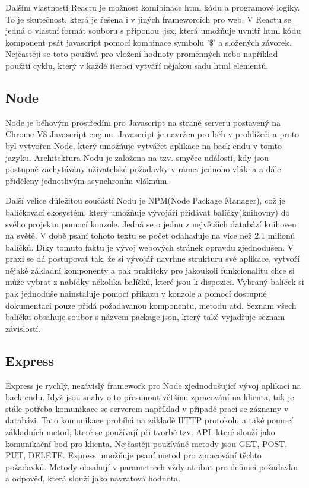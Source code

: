 Dalším vlastností Reactu je možnost komibinace html kódu a programové logiky. To je skutečnost, která je řešena i v jiných frameworcích pro web. V Reactu se jedná o vlastní formát souboru s příponou .jsx, která umožňuje uvnitř html kódu komponent psát javascript pomocí kombinace symbolu '\$' a složených závorek. Nejčastěji se toto používá pro vložení hodnoty proměnných nebo například použití cyklu, který v každé iteraci vytváří nějakou sadu html elementů. 



\subsection{Node}
\cite{node}Node je běhovým prostředím pro Javascript na straně serveru postavený na Chrome V8 Javascript enginu. Javascript je navržen pro běh v prohlížeči a proto byl vytvořen Node, který umožňuje vytvářet aplikace na back-endu v tomto jazyku. Architektura Nodu je založena na tzv. smyčce událostí, kdy jsou postupně zachytávány uživatelské požadavky v rámci jednoho vlákna a dále přiděleny jednotlivým asynchroním vláknům. 

Další velice důležitou součástí Nodu je NPM(Node Package Manager), což je balíčkovací ekosystém, který umožňuje vývojáři přidávat balíčky(knihovny) do svého projektu pomocí konzole. Jedná se o jednu z největších databází knihoven na světě. V době psaní tohoto textu se počet odahaduje na více než 2.1 milionů balíčků. Díky tomuto faktu je vývoj webových stránek opravdu zjednodušen. V praxi se dá postupovat tak, že si vývojář navrhne strukturu své aplikace, vytvoří nějaké základní komponenty a pak prakticky pro jakoukoli funkcionalitu chce si může vybrat z nabídky několika balíčků, které jsou k dispozici. Vybraný balíček si pak jednoduše nainstaluje pomocí příkazu v konzole a pomocí dostupné dokumentaci pouze přidá požadavanou komponentu, metodu atd. Seznam všech balíčku obsahuje soubor s názvem package.json, který také vyjadřuje seznam závislostí.  

\subsection{Express}
\cite{express}Express je rychlý, nezávislý framework pro Node zjednodušující vývoj aplikací na back-endu. Idyž jsou snahy o to přesunout většinu zpracování na klienta, tak je stále potřeba komunikace se serverem například v případě prací se záznamy v databázi. Tato komunikace probíhá na základě HTTP protokolu a také pomocí základních metod, které se používají při tvorbě tzv. API, které slouží jako komunikační bod pro klienta. Nejčastěji používáné metody jsou GET, POST, PUT, DELETE. Express umožňuje psaní metod pro zpracování těchto požadavků. Metody obsahují v parametrech vždy atribut pro definici požadavku a odpověď, která slouží jako navratová hodnota.   

